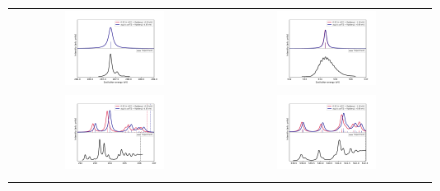 \documentclass[journal=jctcce,manuscript=article]{achemso}
\begin{document}
\begin{figure}\vspace{-0.5cm}
\begin{tabular}{cc}
\hspace{-1cm}\includegraphics[width=0.50\textwidth]{Spectra/CO_C_1.pdf} &
\includegraphics[width=0.50\textwidth]{Spectra/CO_O_1.pdf}\\\vspace{-0.5cm}
\hspace{-1cm}\includegraphics[width=0.50\textwidth]{Spectra/CO_C_2_newshift.pdf} &
\includegraphics[width=0.50\textwidth]{Spectra/CO_O_2.pdf} \\\vspace{-0.5cm}

\end{tabular}
\end{figure}
\end{document}
